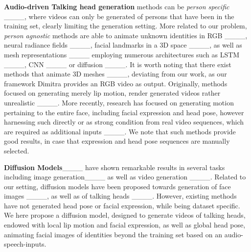 \textbf{Audio-driven Talking head generation} methods can be \textit{person specific} ____, where videos can only be generated of persons that have been in the training set, clearly limiting the generation setting. More related to our problem, \textit{person agnostic} methods are able to animate unknown identities in RGB ____, neural radiance fields ____, facial landmarks in a 3D space ____, as well as mesh representations ____ employing numerous architectures such as LSTM ____, CNN ____ or diffusion ____. It is worth noting that there exist methods that animate 3D meshes ____, deviating from our work, as our framework Dimitra provides an RGB video as output. Originally, methods focused on generating merely lip motion, render generated videos rather unrealistic ____. More recently, research has focused on generating motion pertaining to the entire face, including facial expression and head pose, however harnessing such directly or as strong condition from real video sequences, which are required as additional inputs ____. We note that such methods provide good results, in case that expression and head pose sequences are manually selected. %

\textbf{Diffusion Models}____ have shown remarkable results in several tasks including image generation____ as well as video generation ____. Related to our setting, diffusion models have been proposed towards generation of face images ____, as well as of talking heads ____. However, existing methods have not generated head pose or facial expression, while being dataset specific. We here propose a diffusion model, designed to generate videos of talking heads, endowed with local lip motion and facial expression, as well as global head pose, animating facial images of identities beyond the training set based on an audio-speech-inputs. 


